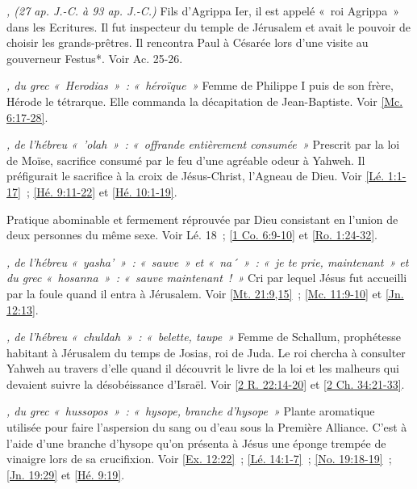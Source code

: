 \begin{multicols}{2}
\textit{, (27 ap. J.-C. à 93 ap. J.-C.)}\newline
Fils d'Agrippa Ier, il est appelé «~roi Agrippa~» dans les Ecritures. Il fut inspecteur du temple de Jérusalem et avait le pouvoir de choisir les grands-prêtres. Il rencontra Paul à Césarée lors d'une visite au gouverneur Festus*. Voir Ac. 25-26.

\textit{, du grec «~Herodias~»~: «~héroïque~»}\newline
Femme de Philippe I puis de son frère, Hérode le tétrarque. Elle commanda la décapitation de Jean-Baptiste. Voir \vref{Mc. 6:17-28}.

\textit{, de l'hébreu «~'olah~»~: «~offrande entièrement consumée~»}\newline
Prescrit par la loi de Moïse, sacrifice consumé par le feu d'une agréable odeur à Yahweh. Il préfigurait le sacrifice à la croix de Jésus-Christ, l'Agneau de Dieu. Voir \vref{Lé. 1:1-17}~; \vref{Hé. 9:11-22} et \vref{Hé. 10:1-19}.

\textit{}\newline
Pratique abominable et fermement réprouvée par Dieu consistant en l'union de deux personnes du même sexe. Voir Lé. 18~; \vref{1 Co. 6:9-10} et \vref{Ro. 1:24-32}.

\textit{, de l'hébreu «~yasha'~»~: «~sauve~» et «~na´~»~: «~je te prie, maintenant~» et du grec «~hosanna~»~: «~sauve maintenant~!~»}\newline
Cri par lequel Jésus fut accueilli par la foule quand il entra à Jérusalem. Voir \vref{Mt. 21:9,15}~; \vref{Mc. 11:9-10} et \vref{Jn. 12:13}.

\textit{, de l'hébreu «~chuldah~»~: «~belette, taupe~»}\newline
Femme de Schallum, prophétesse habitant à Jérusalem du temps de Josias, roi de Juda. Le roi chercha à consulter Yahweh au travers d'elle quand il découvrit le livre de la loi et les malheurs qui devaient suivre la désobéissance d'Israël. Voir \vref{2 R. 22:14-20} et \vref{2 Ch. 34:21-33}.

\textit{, du grec «~hussopos~»~: «~hysope, branche d'hysope~»}\newline
Plante aromatique utilisée pour faire l'aspersion du sang ou d'eau sous la Première Alliance. C'est à l'aide d'une branche d'hysope qu'on présenta à Jésus une éponge trempée de vinaigre lors de sa crucifixion. Voir \vref{Ex. 12:22}~; \vref{Lé. 14:1-7}~; \vref{No. 19:18-19}~; \vref{Jn. 19:29} et \vref{Hé. 9:19}.


\end{multicols}
